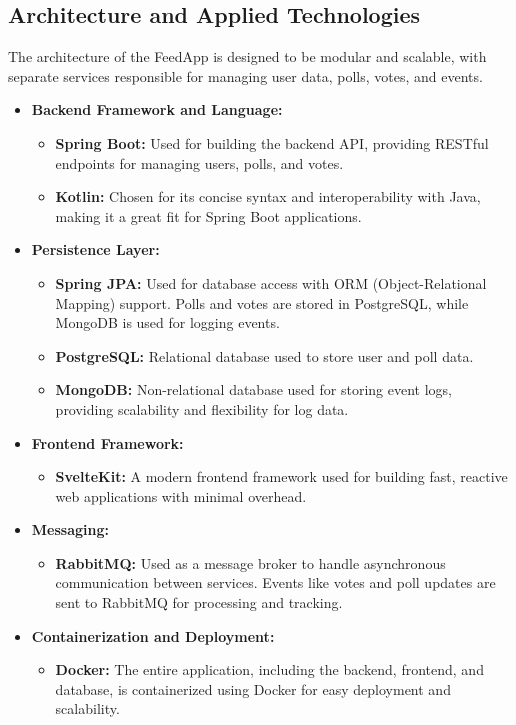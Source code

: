 \subsection{Architecture and Applied Technologies}
The architecture of the FeedApp is designed to be modular and scalable, with separate services responsible for managing user data, polls, votes, and events. 
\begin{itemize}
    \item \textbf{Backend Framework and Language:} 
    \begin{itemize}
        \item \textbf{Spring Boot:} Used for building the backend API, providing RESTful endpoints for managing users, polls, and votes.
        \item \textbf{Kotlin:} Chosen for its concise syntax and interoperability with Java, making it a great fit for Spring Boot applications.
    \end{itemize}
    
    \item \textbf{Persistence Layer:} 
    \begin{itemize}
        \item \textbf{Spring JPA:} Used for database access with ORM (Object-Relational Mapping) support. Polls and votes are stored in PostgreSQL, while MongoDB is used for logging events.
        \item \textbf{PostgreSQL:} Relational database used to store user and poll data.
        \item \textbf{MongoDB:} Non-relational database used for storing event logs, providing scalability and flexibility for log data.
    \end{itemize}
    
    \item \textbf{Frontend Framework:} 
    \begin{itemize}
        \item \textbf{SvelteKit:} A modern frontend framework used for building fast, reactive web applications with minimal overhead.
    \end{itemize}
    
    \item \textbf{Messaging:}
    \begin{itemize}
        \item \textbf{RabbitMQ:} Used as a message broker to handle asynchronous communication between services. Events like votes and poll updates are sent to RabbitMQ for processing and tracking.
    \end{itemize}
    \item \textbf{Containerization and Deployment:} 
    \begin{itemize}
        \item \textbf{Docker:} The entire application, including the backend, frontend, and database, is containerized using Docker for easy deployment and scalability.
    \end{itemize}
\end{itemize}

